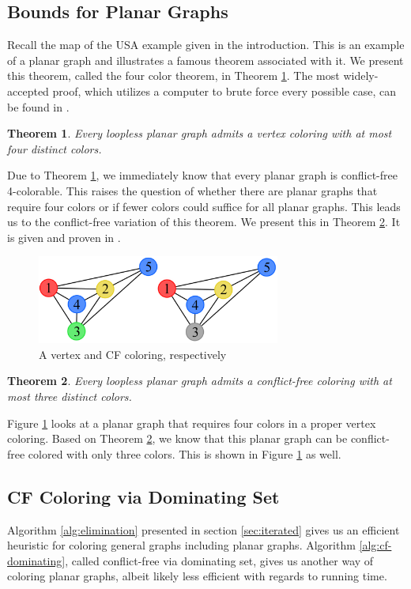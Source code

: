 \documentclass{sig-alternate}
\newtheorem{theorem}{Theorem}
\begin{document}
\subsection{Bounds for Planar Graphs}
\label{sec:bounds}
Recall the map of the USA example given in the introduction. This is an example of a planar graph and illustrates a famous theorem associated with it. We present this theorem, called the four color theorem, in Theorem \ref{thm:four}. The most widely-accepted proof, which utilizes a computer to brute force every possible case, can be found in \cite{robertson1997four}.

\begin{theorem} \label{thm:four}
Every loopless planar graph admits a vertex coloring with at most four distinct colors.
\end{theorem}

Due to Theorem \ref{thm:four}, we immediately know that every planar graph is conflict-free 4-colorable. This raises the question of whether there are planar graphs that require four colors or if fewer colors could suffice for all planar graphs. This leads us to the conflict-free variation of this theorem. We present this in Theorem \ref{thm:four-cf}. It is given and proven in \cite{abel2017three}.

\begin{figure}[h]
	\centering
	\includegraphics[width=8cm,trim=4 4 4 4,clip]{../figures/four.pdf}
	\caption{A vertex and CF coloring, respectively}\label{fig:four}
\end{figure}

\begin{theorem} \label{thm:four-cf}
Every loopless planar graph admits a conflict-free coloring with at most three distinct colors.
\end{theorem}

Figure \ref{fig:four} looks at a planar graph that requires four colors in a proper vertex coloring. Based on Theorem \ref{thm:four-cf}, we know that this planar graph can be conflict-free colored with only three colors. This is shown in Figure \ref{fig:four} as well.

\subsection{CF Coloring via Dominating Set}
\label{sec:coloring-dom}
Algorithm \ref{alg:elimination} presented in section \ref{sec:iterated} gives us an efficient heuristic for coloring general graphs including planar graphs. Algorithm \ref{alg:cf-dominating}, called conflict-free via dominating set, gives us another way of coloring planar graphs, albeit likely less efficient with regards to running time.
\end{document}
